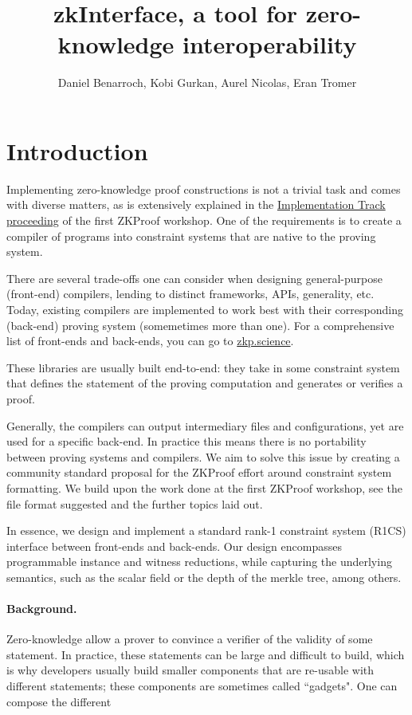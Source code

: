 \documentclass[a4paper,11pt]{article}
\title{zkInterface, a tool for zero-knowledge interoperability}
\author{Daniel Benarroch, Kobi Gurkan, Aurel Nicolas, Eran Tromer}
\newcommand\dtodo[1]{\todo[color=red!20]{#1}}
\begin{document}
		
		\maketitle
		

		\section{Introduction}
		Implementing zero-knowledge proof constructions is not a trivial task and comes with diverse matters, as is extensively explained in the \href{https://zkproof.org/proceedings-snapshots/zkproof-implementation-20180801.pdf}{Implementation Track proceeding} of the first ZKProof workshop. One of the requirements is to create a compiler of programs into constraint systems that are native to the proving system.
		
		There are several trade-offs one can consider when designing general-purpose (front-end) compilers, lending to distinct frameworks, APIs, generality, etc. Today, existing compilers are implemented to work best with their corresponding (back-end) proving system (somemetimes more than one). For a comprehensive list of front-ends and back-ends, you can go to \href{https://zkp.science}{zkp.science}. 
		
		These libraries are usually built end-to-end: they take in some constraint system that defines the statement of the proving computation and generates or verifies a proof. 
		
		Generally, the compilers can output intermediary files and configurations, yet are used for a specific back-end. In practice this means there is no portability between proving systems and compilers. We aim to solve this issue by creating a community standard proposal for the ZKProof effort around constraint system formatting. We build upon the work done at the first ZKProof workshop, see the file format suggested and the further topics laid out. 
		
		In essence, we design and implement a standard rank-1 constraint system (R1CS) interface between front-ends and back-ends. Our design encompasses programmable instance and witness reductions, while capturing the underlying semantics, such as the scalar field or the depth of the merkle tree, among others.

		\dtodo{Review the introduction}
		
		\paragraph{Background.} Zero-knowledge allow a prover to convince a verifier of the validity of some statement. In practice, these statements can be large and difficult to build, which is why developers usually build smaller components that are re-usable with different statements; these components are sometimes called ``gadgets". One can compose the different 
		
\end{document}
